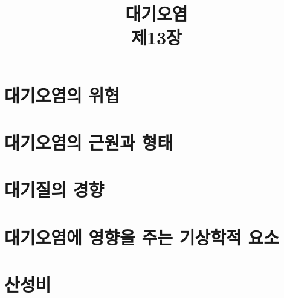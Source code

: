 \title[]{대기오염\\\small{제13장}}

\begin{frame}[plain] %
	\titlepage
\end{frame}


\section{대기오염의 위협}


\section{대기오염의 근원과 형태}

\section{대기질의 경향}

\section{대기오염에 영향을 주는 기상학적 요소}

\section{산성비}


